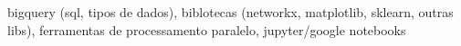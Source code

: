 
bigquery (sql, tipos de dados), biblotecas (networkx, matplotlib, sklearn, outras libs), ferramentas de processamento paralelo, jupyter/google notebooks
